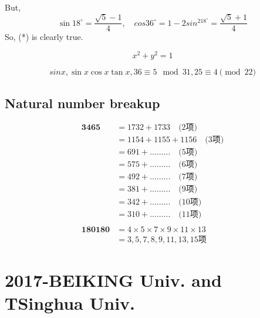 \documentclass[11pt,a4paper]{article}
\begin{document}
But,
$$\sin18^{\circ}=\frac{\sqrt{5}-1}{4},\quad cos36^{\circ}=1-2sin^218^{\circ}=\frac{\sqrt{5}+1}{4}$$
So, (*) is clearly true.

\begin{equation}
x^2 + y^2 = 1
\end{equation}

\[ sinx, \sin x\cos x \tan x, 36\equiv5\mod{31}, 25\equiv4\pmod{22} \]

\subsection{Natural number breakup}

\begin{CJK}{UTF8}{gbsn}
	
\begin{eqnarray*}
\textbf{3465} & =1732+1733 \quad \text{(2项)} \\
     & =1154+1155+1156 \quad \text{(3项)} \\
     & =691 +......... \quad \text{(5项)} \\
     & =575 +.........  \quad \text{(6项)} \\
     & =492 +.........  \quad \text{(7项)} \\
     & =381 +.........  \quad \text{(9项)} \\
     & =342 +.........  \quad \text{(10项)} \\
     & =310 +.........  \quad \text{(11项)} \\     
\\
\textbf{180180} & = 4 \times 5 \times 7 \times 9 \times 11 \times 13 \\
	& = 3,5,7,8,9,11,13,15 \text{项}
\end{eqnarray*}

\end{CJK}
\newpage
\section{2017-BEIKING Univ. and TSinghua Univ.}
\end{document}
